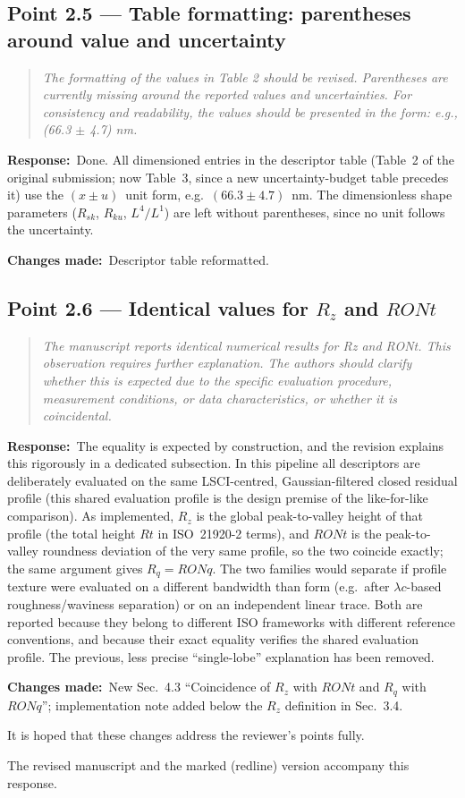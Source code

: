 \documentclass[11pt,a4paper]{article}
\newenvironment{reviewercomment}%
{\par\medskip\noindent\begin{quotation}\itshape\color{black!70}}%
{\end{quotation}\medskip}
\newcommand{\response}{\par\noindent\textbf{Response:}\ }
\newcommand{\changes}{\par\noindent\textbf{Changes made:}\ }
\begin{document}
\subsection*{Point 2.5 --- Table formatting: parentheses around value and uncertainty}
\begin{reviewercomment}
The formatting of the values in Table 2 should be revised. Parentheses are currently missing around the reported values and uncertainties. For consistency and readability, the values should be presented in the form: e.g., (66.3 $\pm$ 4.7) nm.
\end{reviewercomment}
\response Done. All dimensioned entries in the descriptor table (Table~2 of the original submission; now Table~3, since a new uncertainty-budget table precedes it) use the $(x \pm u)$~unit form, e.g.\ $(66.3 \pm 4.7)$~nm. The dimensionless shape parameters ($R_{sk}$, $R_{ku}$, $L^4/L^1$) are left without parentheses, since no unit follows the uncertainty.
\changes Descriptor table reformatted.

\subsection*{Point 2.6 --- Identical values for $R_z$ and $RONt$}
\begin{reviewercomment}
The manuscript reports identical numerical results for Rz and RONt. This observation requires further explanation. The authors should clarify whether this is expected due to the specific evaluation procedure, measurement conditions, or data characteristics, or whether it is coincidental.
\end{reviewercomment}
\response The equality is expected by construction, and the revision explains this rigorously in a dedicated subsection. In this pipeline all descriptors are deliberately evaluated on the same LSCI-centred, Gaussian-filtered closed residual profile (this shared evaluation profile is the design premise of the like-for-like comparison). As implemented, $R_z$ is the global peak-to-valley height of that profile (the total height $Rt$ in ISO~21920-2 terms), and $RONt$ is the peak-to-valley roundness deviation of the very same profile, so the two coincide exactly; the same argument gives $R_q=RONq$. The two families would separate if profile texture were evaluated on a different bandwidth than form (e.g.\ after $\lambda c$-based roughness/waviness separation) or on an independent linear trace. Both are reported because they belong to different ISO frameworks with different reference conventions, and because their exact equality verifies the shared evaluation profile. The previous, less precise ``single-lobe'' explanation has been removed.
\changes New Sec.~4.3 ``Coincidence of $R_z$ with $RONt$ and $R_q$ with $RONq$''; implementation note added below the $R_z$ definition in Sec.~3.4.

\bigskip
It is hoped that these changes address the reviewer's points fully.

\bigskip
The revised manuscript and the marked (redline) version accompany this response.
\end{document}
